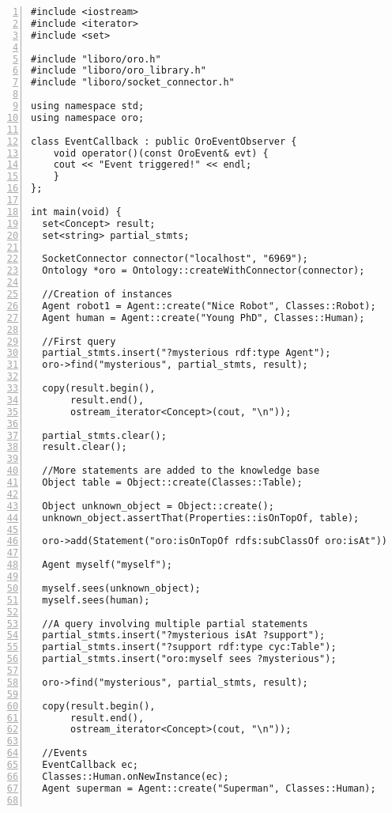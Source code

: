 \lstset{language=c++}
\begin{lstlisting}[numbers=left,caption=Example of interaction with {\tt oro-server} in C++, label = code|ex-cpp]
#include <iostream>
#include <iterator>
#include <set>

#include "liboro/oro.h"
#include "liboro/oro_library.h"
#include "liboro/socket_connector.h"

using namespace std;
using namespace oro;

class EventCallback : public OroEventObserver {
    void operator()(const OroEvent& evt) {
    cout << "Event triggered!" << endl;
    }
};
  
int main(void) {
  set<Concept> result;
  set<string> partial_stmts;
  
  SocketConnector connector("localhost", "6969");
  Ontology *oro = Ontology::createWithConnector(connector);
  
  //Creation of instances
  Agent robot1 = Agent::create("Nice Robot", Classes::Robot);
  Agent human = Agent::create("Young PhD", Classes::Human);
  
  //First query
  partial_stmts.insert("?mysterious rdf:type Agent");
  oro->find("mysterious", partial_stmts, result);
  
  copy(result.begin(), 
       result.end(), 
       ostream_iterator<Concept>(cout, "\n"));
  
  partial_stmts.clear();
  result.clear();
  
  //More statements are added to the knowledge base
  Object table = Object::create(Classes::Table);

  Object unknown_object = Object::create();
  unknown_object.assertThat(Properties::isOnTopOf, table);
  
  oro->add(Statement("oro:isOnTopOf rdfs:subClassOf oro:isAt"));
  
  Agent myself("myself");
  
  myself.sees(unknown_object);
  myself.sees(human);
  
  //A query involving multiple partial statements
  partial_stmts.insert("?mysterious isAt ?support");
  partial_stmts.insert("?support rdf:type cyc:Table");
  partial_stmts.insert("oro:myself sees ?mysterious");
  
  oro->find("mysterious", partial_stmts, result);
  
  copy(result.begin(), 
       result.end(), 
       ostream_iterator<Concept>(cout, "\n"));
  
  //Events
  EventCallback ec;
  Classes::Human.onNewInstance(ec);
  Agent superman = Agent::create("Superman", Classes::Human);
  

\end{lstlisting}
